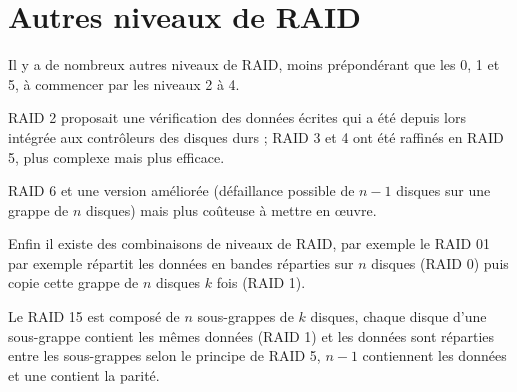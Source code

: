 \section{Autres niveaux de RAID}
Il y a de nombreux autres niveaux de RAID, moins prépondérant que les 0, 1 et 5, à commencer par les niveaux 2 à 4.

 RAID 2 proposait une vérification des données écrites qui a été depuis lors intégrée aux contrôleurs des disques durs ; RAID 3 et 4 ont été raffinés en RAID 5, plus complexe mais plus efficace. 

RAID 6 et une version améliorée (défaillance possible de $n-1$ disques sur une grappe de $n$ disques) mais plus coûteuse à mettre en \oe{}uvre. 

Enfin il existe des combinaisons de niveaux de RAID, par exemple le RAID 01 par exemple répartit les données en bandes réparties sur $n$ disques (RAID 0) puis copie cette grappe de $n$ disques $k$ fois (RAID 1). 

Le RAID 15 est composé de $n$ sous-grappes de $k$ disques, chaque disque d'une sous-grappe contient les mêmes données (RAID 1) et les données sont réparties entre les sous-grappes selon le principe de RAID 5, $n-1$ contiennent les données et une contient la parité. 